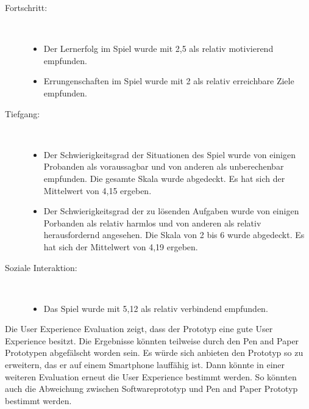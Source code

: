 \begin{description}
\item[Fortschritt:] \ 
\begin{itemize}
\item Der Lernerfolg im Spiel wurde mit 2,5 als relativ motivierend empfunden.

\item Errungenschaften im Spiel wurde mit 2 als relativ erreichbare Ziele empfunden.

\end{itemize}


\item[Tiefgang:] \ 
\begin{itemize}
\item Der Schwierigkeitsgrad der Situationen des Spiel wurde von einigen Probanden als voraussagbar und von anderen als unberechenbar empfunden. Die gesamte Skala wurde abgedeckt. Es hat sich der Mittelwert von 4,15 ergeben.

\item Der Schwierigkeitsgrad der zu lösenden Aufgaben wurde von einigen Porbanden als relativ harmlos und von anderen als relativ herausfordernd angesehen. Die Skala von 2 bis 6 wurde abgedeckt. Es hat sich der Mittelwert von 4,19 ergeben.
\end{itemize}




\item[Soziale Interaktion:]\ 
\begin{itemize}

\item Das Spiel wurde mit 5,12 als relativ verbindend empfunden.

\end{itemize}




\end{description}


Die User Experience Evaluation zeigt, dass der Prototyp eine gute User Experience besitzt. Die Ergebnisse könnten teilweise durch den Pen and Paper Prototypen abgefälscht worden sein. Es würde sich anbieten den Prototyp so zu erweitern, das er auf einem Smartphone lauffähig ist. Dann könnte in einer weiteren Evaluation erneut die User Experience bestimmt werden. So könnten auch die Abweichung zwischen Softwareprototyp und Pen and Paper Prototyp bestimmt werden. 